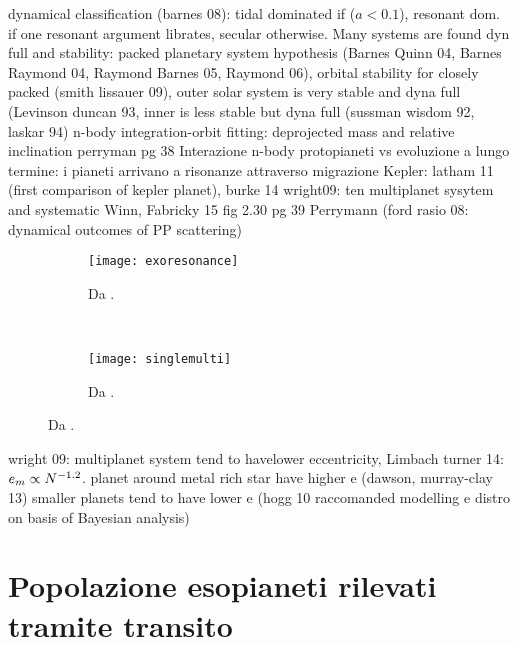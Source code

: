 \begin{workout}
dynamical classification (barnes 08): tidal dominated if ($a<0.1$), resonant dom. if one resonant argument librates, secular otherwise.
Many systems are found dyn full and stability: packed planetary system hypothesis (Barnes Quinn 04, Barnes Raymond 04, Raymond Barnes 05, Raymond 06), orbital stability for closely packed (smith lissauer 09), outer solar system is very stable and dyna full (Levinson duncan 93, inner is less stable but dyna full (sussman wisdom 92, laskar 94)
n-body integration-orbit fitting: deprojected mass and relative inclination
perryman pg 38
Interazione n-body protopianeti vs evoluzione a lungo termine: i pianeti arrivano a risonanze attraverso migrazione
Kepler: latham 11 (first comparison of kepler planet), burke 14
wright09: ten multiplanet sysytem and systematic
Winn, Fabricky 15
fig 2.30 pg 39 Perrymann
(ford rasio 08: dynamical outcomes of PP scattering)

\begin{figure}[!ht]
\begin{subfigure}[b]{0.47\textwidth}
\centering
\texttt{[image: exoresonance]}
\caption{Da \cite{winnfabrycky15}.}\label{fig:exoresonance}
\end{subfigure}
~
\begin{subfigure}[b]{0.47\textwidth}
\centering
\texttt{[image: singlemulti]}
\caption{Da \cite{wright09}.}\label{fig:singlemulti}
\end{subfigure}
\end{figure}
\end{workout}

\begin{workout}
wright 09: multiplanet system tend to havelower eccentricity,
Limbach turner 14: $e_m\propto N^{-1.2}$.
planet around metal rich star have higher e (dawson, murray-clay 13)
smaller planets tend to have lower e (hogg 10 raccomanded modelling e distro on basis of Bayesian analysis)
\end{workout}

\clearpage

\section{Popolazione esopianeti rilevati tramite transito}


